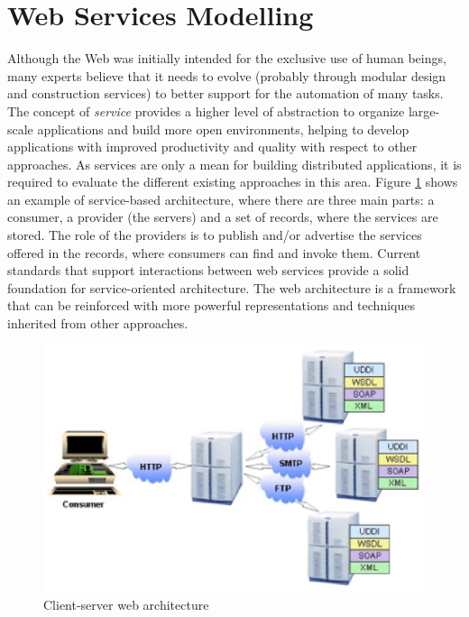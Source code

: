  
\section{Web Services Modelling}

Although the Web was initially intended for the exclusive use of human beings, 
many experts believe that it needs to evolve (probably through modular design 
and construction services) to better support for the automation of many tasks. 
The concept of \emph{service} provides a higher level of abstraction to organize 
large-scale applications and build more open environments, helping to develop 
applications with improved productivity and quality with respect to other approaches. 
As services are only a mean for building distributed applications, 
it is required to evaluate the different existing approaches in this area. 
Figure \ref{arch} shows an example of service-based architecture, 
where there are three main parts: a consumer, a provider (the servers) and a set of records, 
where the services are stored. The role of the providers is to publish and/or advertise the 
services offered in the records, where consumers can find and invoke them. 
Current standards that support interactions between web services provide a 
solid foundation for service-oriented architecture. 
The web architecture is a framework that can be reinforced with more 
powerful representations and techniques inherited from other approaches.

\begin{figure}
\begin{center}
  \includegraphics[width =\columnwidth]{Figures/clientserver.eps}
\end{center}
  \caption{Client-server web architecture}
  \label{arch}
\end{figure}

